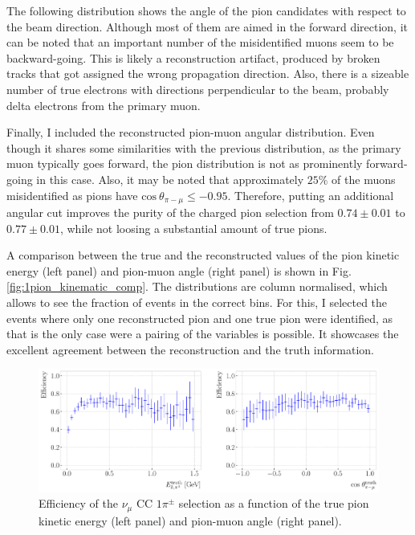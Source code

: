 The following distribution shows the angle of the pion candidates with respect to the beam direction. Although most of them are aimed in the forward direction, it can be noted that an important number of the misidentified muons seem to be backward-going. This is likely a reconstruction artifact, produced by broken tracks that got assigned the wrong propagation direction. Also, there is a sizeable number of true electrons with directions perpendicular to the beam, probably delta electrons from the primary muon.

Finally, I included the reconstructed pion-muon angular distribution. Even though it shares some similarities with the previous distribution, as the primary muon typically goes forward, the pion distribution is not as prominently forward-going in this case. Also, it may be noted that approximately $25\%$ of the muons misidentified as pions have $\mathrm{cos}~\theta_{\pi - \mu} \leq -0.95$. Therefore, putting an additional angular cut improves the purity of the charged pion selection from $0.74 \pm 0.01$ to $0.77 \pm 0.01$, while not loosing a substantial amount of true pions.

A comparison between the true and the reconstructed values of the pion kinetic energy (left panel) and pion-muon angle (right panel) is shown in Fig. \ref{fig:1pion_kinematic_comp}. The distributions are column normalised, which allows to see the fraction of events in the correct bins. For this, I selected the events where only one reconstructed pion and one true pion were identified, as that is the only case were a pairing of the variables is possible. It showcases the excellent agreement between the reconstruction and the truth information.

\begin{figure}[t]
    \centering
    \includegraphics[width=.99\linewidth]{Images/GAr_selection/pion_selection_1pion_kin_efficiency.pdf}
    \caption[Efficiency of the $\nu_{\mu}$ CC $1\pi^{\pm}$ selection as a function of the true pion kinetic energy and pion-muon angle.]{Efficiency of the $\nu_{\mu}$ CC $1\pi^{\pm}$ selection as a function of the true pion kinetic energy (left panel) and pion-muon angle (right panel).}
    \label{fig:1pion_kin_efficiency}
\end{figure}

